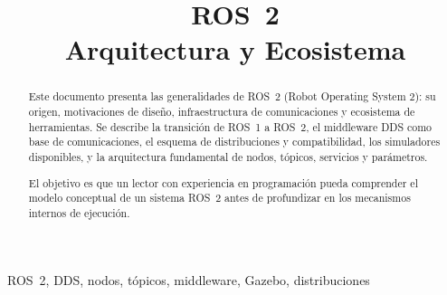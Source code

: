 \documentclass[conference]{IEEEtran}
\begin{document}
\title{ROS~2\\
Arquitectura y Ecosistema}


\maketitle

\begin{abstract}
Este documento presenta las generalidades de ROS~2 (Robot Operating System 2):
su origen, motivaciones de diseño, infraestructura de comunicaciones y
ecosistema de herramientas. Se describe la transición de ROS~1 a ROS~2, el
middleware DDS como base de comunicaciones, el esquema de distribuciones y
compatibilidad, los simuladores disponibles, y la arquitectura fundamental de
nodos, tópicos, servicios y parámetros.

El objetivo es que un lector con experiencia en programación pueda comprender
el modelo conceptual de un sistema ROS~2 antes de profundizar en los
mecanismos internos de ejecución.
\end{abstract}

\begin{IEEEkeywords}
ROS~2, DDS, nodos, tópicos, middleware, Gazebo, distribuciones
\end{IEEEkeywords}












\clearpage


\end{document}
